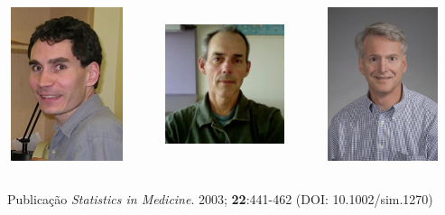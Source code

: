 \documentclass[ignorenonframetext,]{beamer}
\begin{document}
\begin{frame}

\vspace{.2cm}\begin{columns}
 \begin{column}{.33\textwidth}
  \begin{center}
   \includegraphics*[height = 4.5cm, width = 3.5cm]{bureau.jpg}
  \end{center}
 \end{column}
 \begin{column}{.33\textwidth}
  \begin{center}
    \includegraphics*[height = 4.5cm, width = 3.5cm]{shiboski.jpg}
  \end{center}
 \end{column}
 \begin{column}{.33\textwidth}
  \begin{center}
    \includegraphics*[height = 4.5cm, width = 3.5cm]{hughes.jpg}
  \end{center}
 \end{column}
\end{columns}

\vspace{.3cm}\begin{block}{Publicação}
 \textit{Statistics in Medicine}. 2003; \textbf{22}:441-462
 (DOI: 10.1002/sim.1270)
\end{block}

\end{frame}
\end{document}
